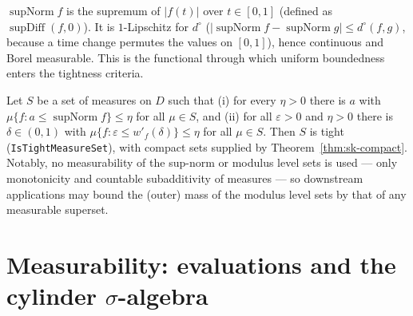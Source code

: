 \begin{definition}\label{def:sk-supnorm}
  \leanok
  $\operatorname{supNorm} f$ is the supremum of $|f(t)|$ over $t\in[0,1]$ (defined as
  $\operatorname{supDiff}(f,0)$).  It is $1$-Lipschitz for $d^\circ$
  ($|\operatorname{supNorm} f-\operatorname{supNorm} g|\le d^\circ(f,g)$, because a time
  change permutes the values on $[0,1]$), hence continuous and Borel measurable.  This is
  the functional through which uniform boundedness enters the tightness criteria.
\end{definition}

\begin{theorem}\label{thm:sk-tight-bridge}
  \leanok
  Let $S$ be a set of measures on $D$ such that (i) for every $\eta>0$ there is $a$ with
  $\mu\{f: a\le\operatorname{supNorm} f\}\le\eta$ for all $\mu\in S$, and (ii) for all
  $\varepsilon>0$ and $\eta>0$ there is $\delta\in(0,1)$ with
  $\mu\{f:\varepsilon\le w'_f(\delta)\}\le\eta$ for all $\mu\in S$.  Then $S$ is tight
  (\texttt{IsTightMeasureSet}), with compact sets supplied by
  Theorem~\ref{thm:sk-compact}.  Notably, no measurability of the sup-norm or modulus
  level sets is used --- only monotonicity and countable subadditivity of measures --- so
  downstream applications may bound the (outer) mass of the modulus level sets by that of
  any measurable superset.
\end{theorem}

\section{Measurability: evaluations and the cylinder \texorpdfstring{$\sigma$}{sigma}-algebra}


